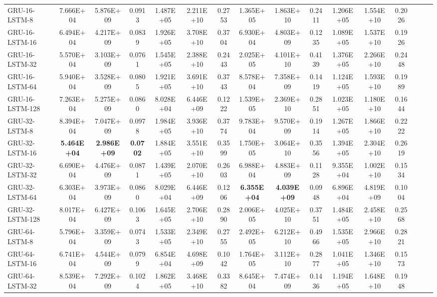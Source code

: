 \begin{landscape}
\begin{longtable}{|l|c|c|c|c|c|c|c|c|c|c|c|c|c|c|c|}
    GRU-16-LSTM-8 & 7.666E+04 & 5.876E+09 & 0.0913 & 1.487E+05 & 2.211E+10 & 0.2753 & 1.365E+05 & 1.863E+10 & 0.2411 & 1.206E+05 & 1.554E+10 & 0.2026 \\
    GRU-16-LSTM-16 & 6.494E+04 & 4.217E+09 & 0.0839 & 1.926E+05 & 3.708E+10 & 0.3704 & 6.930E+04 & 4.803E+09 & 0.1235 & 1.089E+05 & 1.537E+10 & 0.1926 \\
    GRU-16-LSTM-32 & 5.570E+04 & 3.103E+09 & 0.0761 & 1.545E+05 & 2.388E+10 & 0.2443 & 2.025E+05 & 4.101E+10 & 0.4139 & 1.376E+05 & 2.266E+10 & 0.2448 \\
    GRU-16-LSTM-64 & 5.940E+04 & 3.528E+09 & 0.0805 & 1.921E+05 & 3.691E+10 & 0.3743 & 8.578E+04 & 7.358E+09 & 0.1419 & 1.124E+05 & 1.593E+10 & 0.1989 \\
    GRU-16-LSTM-128 & 7.263E+04 & 5.275E+09 & 0.0860 & 8.028E+04 & 6.446E+09 & 0.1222 & 1.539E+05 & 2.369E+10 & 0.2851 & 1.023E+05 & 1.180E+10 & 0.1644 \\
    GRU-32-LSTM-8 & 8.394E+04 & 7.047E+09 & 0.0978 & 1.984E+05 & 3.936E+10 & 0.3774 & 9.783E+04 & 9.570E+09 & 0.1914 & 1.267E+05 & 1.866E+10 & 0.2222 \\
    GRU-32-LSTM-16 & \cellcolor[rgb]{ .573,  .816,  .314}\textbf{5.464E+04} & \cellcolor[rgb]{ .573,  .816,  .314}\textbf{2.986E+09} & \cellcolor[rgb]{ .573,  .816,  .314}\textbf{0.0702} & 1.884E+05 & 3.551E+10 & 0.3599 & 1.750E+05 & 3.064E+10 & 0.3556 & 1.394E+05 & 2.304E+10 & 0.2619 \\
    GRU-32-LSTM-32 & 6.690E+04 & 4.476E+09 & 0.0871 & 1.439E+05 & 2.070E+10 & 0.2603 & 6.988E+04 & 4.883E+09 & 0.1128 & 9.355E+04 & 1.002E+10 & 0.1534 \\
    GRU-32-LSTM-64 & 6.303E+04 & 3.973E+09 & 0.0860 & 8.029E+04 & 6.446E+09 & 0.1206 & \cellcolor[rgb]{ .573,  .816,  .314}\textbf{6.355E+04} & \cellcolor[rgb]{ .573,  .816,  .314}\textbf{4.039E+09} & 0.0948 & 6.896E+04 & 4.819E+09 & 0.1004 \\
    GRU-32-LSTM-128 & 8.017E+04 & 6.427E+09 & 0.1063 & 1.645E+05 & 2.706E+10 & 0.2890 & 2.006E+05 & 4.025E+10 & 0.3751 & 1.484E+05 & 2.458E+10 & 0.2568 \\
    GRU-64-LSTM-8 & 5.796E+04 & 3.359E+09 & 0.0743 & 1.533E+05 & 2.349E+10 & 0.2755 & 2.492E+05 & 6.212E+10 & 0.4966 & 1.535E+05 & 2.966E+10 & 0.2821 \\
    GRU-64-LSTM-16 & 6.741E+04 & 4.544E+09 & 0.0799 & 6.854E+04 & 4.698E+09 & 0.1042 & 1.764E+05 & 3.112E+10 & 0.2877 & 1.041E+05 & 1.346E+10 & 0.1573 \\
    GRU-64-LSTM-32 & 8.539E+04 & 7.292E+09 & 0.1024 & 1.862E+05 & 3.468E+10 & 0.3382 & 8.645E+04 & 7.474E+09 & 0.1436 & 1.194E+05 & 1.648E+10 & 0.1948 \\

\end{longtable}
\end{landscape}
